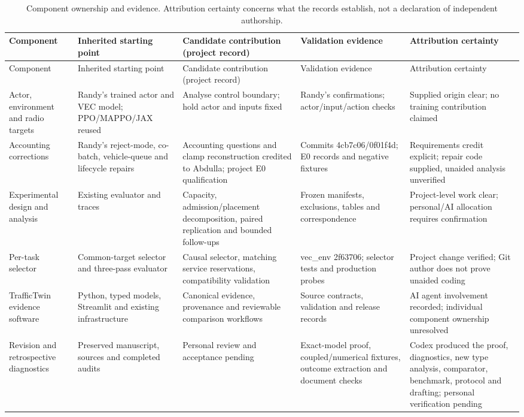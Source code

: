 \documentclass[11pt,a4paper]{article}
\begin{document}
\begingroup
\small
\begin{xltabular}{\textwidth}{@{}YYYYY@{}}
\caption{Component ownership and evidence. Attribution certainty concerns what the records establish, not a declaration of independent authorship.}\label{tab:11} \\
\toprule
Component & Inherited starting point & Candidate contribution (project record) & Validation evidence & Attribution certainty \\
\midrule\endfirsthead
\toprule
Component & Inherited starting point & Candidate contribution (project record) & Validation evidence & Attribution certainty \\
\midrule\endhead
\bottomrule\endfoot
Actor, environment and radio targets & Randy's trained actor and VEC model; PPO/MAPPO/JAX reused & Analyse control boundary; hold actor and inputs fixed & Randy's confirmations; actor/input/action checks & Supplied origin clear; no training contribution claimed \\
Accounting corrections & Randy's reject-mode, co-batch, vehicle-queue and lifecycle repairs & Accounting questions and clamp reconstruction credited to Abdulla; project E0 qualification & Commits 4cb7c06/0f01f4d; E0 records and negative fixtures & Requirements credit explicit; repair code supplied, unaided analysis unverified \\
Experimental design and analysis & Existing evaluator and traces & Capacity, admission/placement decomposition, paired replication and bounded follow-ups & Frozen manifests, exclusions, tables and correspondence & Project-level work clear; personal/AI allocation requires confirmation \\
Per-task selector & Common-target selector and three-pass evaluator & Causal selector, matching service reservations, compatibility validation & vec\_env 2f63706; selector tests and production probes & Project change verified; Git author does not prove unaided coding \\
TrafficTwin evidence software & Python, typed models, Streamlit and existing infrastructure & Canonical evidence, provenance and reviewable comparison workflows & Source contracts, validation and release records & AI agent involvement recorded; individual component ownership unresolved \\
Revision and retrospective diagnostics & Preserved manuscript, sources and completed audits & Personal review and acceptance pending & Exact-model proof, coupled/numerical fixtures, outcome extraction and document checks & Codex produced the proof, diagnostics, new type analysis, comparator, benchmark, protocol and drafting; personal verification pending \\
\end{xltabular}
\endgroup
\end{document}
